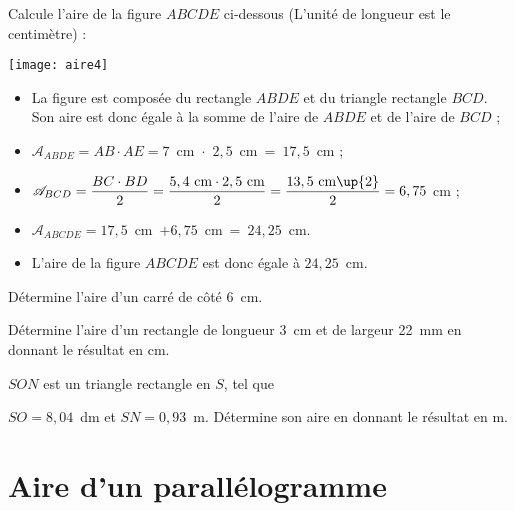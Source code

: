 \vspace{2em}

\begin{methode*1}

\begin{exemple*1}
Calcule l'aire de la figure $ABCDE$ ci‑dessous (L'unité de longueur est le centimètre) :
\begin{center}  \texttt{[image: aire4]} \end{center}

 \begin{itemize}
  \item La figure est composée du rectangle $ABDE$ et du triangle rectangle $BCD$. Son aire est donc égale à la somme de l'aire de $ABDE$ et de l'aire de $BCD$ ;
  \item $\mathcal{A}_{ABDE} = AB \cdot AE = 7$ cm $\cdot$ $2,5$ cm = $17,5$ cm ; \\[0.2em]
  \item $\mathcal{A}_{BCD} = \dfrac{BC \cdot BD}{2} = \dfrac{5,4 \text{ cm} \cdot 2,5 \text{ cm}}{2} = \dfrac{13,5 \text{ cm}\up{2}}{2} = 6,75 $ cm ;\\[0.2em]
  \item $\mathcal{A}_{ABCDE} = 17,5$ cm $+ 6,75$ cm = $24,25$ cm.
  \item L'aire de la figure $ABCDE$ est donc égale à $24,25$ cm.
  \end{itemize}
\end{exemple*1}

\exercice 
Détermine l'aire d'un carré de côté 6 cm. 

\exercice 
Détermine l'aire d'un rectangle de longueur 3 cm et de largeur 22 mm en donnant le résultat en cm.
     
\exercice 
$SON$ est un triangle rectangle en $S$, tel que 

$SO = 8,04$ dm et $SN = 0,93$ m. Détermine son aire en donnant le résultat en m.
 
\end{methode*1}

\newpage

\section{Aire d'un parallélogramme}

